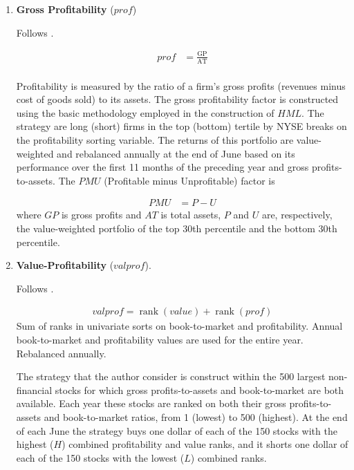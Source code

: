\begin{enumerate}
	\item \textbf{Gross Profitability} ($prof$)
	
	Follows . 
	
	\begin{align*}
		prof &= \frac{ \mathrm{GP} }{ \mathrm{AT} } \\
	\end{align*}
	
	Profitability is measured by the ratio of a firm's gross profits (revenues minus cost of goods sold) to its assets. The gross profitability factor is constructed using the basic methodology employed in the construction of $HML$. The strategy are long (short) firms in the top (bottom) tertile by NYSE breaks on the profitability sorting variable. The returns of this portfolio are value-weighted and rebalanced annually at the end of June based on its performance over the first 11 months of the preceding year and gross profits-to-assets. The $PMU$ (Profitable minus Unprofitable) factor is 
	
	\begin{align*}
		PMU &= P - U
	\end{align*}
	where $GP$ is gross profits and $AT$ is total assets, $P$ and $U$ are, respectively, the value-weighted portfolio of the top 30th percentile and the bottom 30th percentile.
	
	
	
	\item \textbf{Value-Profitability} ($valprof$).
	
	Follows . 
	
	\begin{align*}
		valprof = \operatorname{rank}(value) + \operatorname{rank}(prof)
	\end{align*}
	Sum of ranks in univariate sorts on book-to-market and profitability. Annual book-to-market and profitability values are used for the entire year. Rebalanced annually.
	
	The strategy that the author consider is construct within the 500 largest non-financial stocks for which gross profits-to-assets and book-to-market are both available. Each year these stocks are ranked on both their gross profits-to-assets and book-to-market ratios, from 1 (lowest) to 500 (highest). At the end of each June the strategy buys one dollar of each of the 150 stocks with the highest ($H$) combined profitability and value ranks, and it shorts one dollar of each of the 150 stocks with the lowest ($L$) combined ranks.
		

\end{enumerate}

